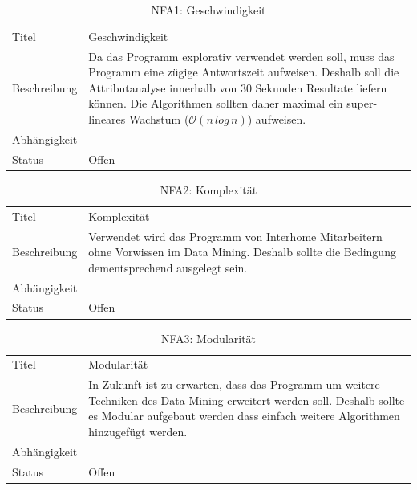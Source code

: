 \begin{table}[H] 
	\caption{NFA1: Geschwindigkeit}
	\centering
	\label{fig:anforderungsanalyse:nichtfunktionaleanforderung:nfa1}
	\begin{tabular}{ | l | L{10cm} | } 
		\hline 
		 \\ \hline 
		Titel & Geschwindigkeit \\ \hline 
		Beschreibung & Da das Programm explorativ verwendet werden soll, muss das Programm eine zügige Antwortszeit aufweisen. Deshalb soll die Attributanalyse innerhalb von 30 Sekunden Resultate liefern können. Die Algorithmen sollten daher maximal ein super-lineares Wachstum ($\mathcal{O}(n\,log\,n)$) aufweisen. \\ \hline 
		Abhängigkeit & \\ \hline 
		Status & Offen \\ \hline 
	\end{tabular}
\end{table}

\begin{table}[H] 
	\caption{NFA2: Komplexität}
	\centering
	\label{fig:anforderungsanalyse:nichtfunktionaleanforderung:nfa2}
	\begin{tabular}{ | l | L{10cm} | } 
		\hline 
		 \\ \hline 
		Titel & Komplexität \\ \hline 
		Beschreibung & Verwendet wird das Programm von Interhome Mitarbeitern ohne Vorwissen im Data Mining. Deshalb sollte die Bedingung dementsprechend ausgelegt sein. \\ \hline 
		Abhängigkeit & \\ \hline 
		Status & Offen \\ \hline 
	\end{tabular}
\end{table}

\begin{table}[H] 
	\caption{NFA3: Modularität}
	\centering
	\label{fig:anforderungsanalyse:nichtfunktionaleanforderung:nfa3}
	\begin{tabular}{ | l | L{10cm} | } 
		\hline 
		 \\ \hline 
		Titel & Modularität \\ \hline 
		Beschreibung & In Zukunft ist zu erwarten, dass das Programm um weitere Techniken des Data Mining erweitert werden soll. Deshalb sollte es Modular aufgebaut werden dass einfach weitere Algorithmen hinzugefügt werden. \\ \hline 
		Abhängigkeit & \\ \hline 
		Status & Offen \\ \hline 
	\end{tabular}
\end{table}

